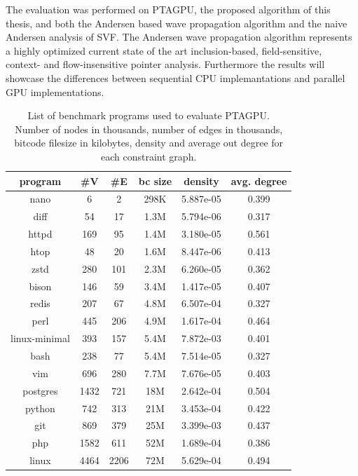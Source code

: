 The evaluation was performed on PTAGPU, the proposed algorithm of this thesis, and both the Andersen based wave propagation algorithm and the naive Andersen analysis of SVF.
The Andersen wave propagation algorithm represents a highly optimized current state of the art inclusion-based, field-sensitive, context- and flow-insensitive pointer analysis.
Furthermore the results will showcase the differences between sequential CPU implemantations and parallel GPU implementations.

\begin{table}
    \centering
    \begin{tabular}{||c c c c S[table-format = 1.3,retain-zero-exponent=true] c||}
        \hline
        program       & \#V  & \#E  & bc size & {density} & avg. degree \\
        \hline\hline
        nano          & 6    & 2    & 298K    & 5.887e-05 & 0.399       \\ 
        diff          & 54   & 17   & 1.3M    & 5.794e-06 & 0.317       \\
        httpd         & 169  & 95   & 1.4M    & 3.180e-05 & 0.561       \\
        htop          & 48   & 20   & 1.6M    & 8.447e-06 & 0.413       \\
        zstd          & 280  & 101  & 2.3M    & 6.260e-05 & 0.362       \\
        bison         & 146  & 59   & 3.4M    & 1.417e-05 & 0.407       \\
        redis         & 207  & 67   & 4.8M    & 6.507e-04 & 0.327       \\
        perl          & 445  & 206  & 4.9M    & 1.617e-04 & 0.464       \\
        linux-minimal & 393  & 157  & 5.4M    & 7.872e-03 & 0.401       \\
        bash          & 238  & 77   & 5.4M    & 7.514e-05 & 0.327       \\
        vim           & 696  & 280  & 7.7M    & 7.676e-05 & 0.403       \\
        postgres      & 1432 & 721  & 18M     & 2.642e-04 & 0.504       \\
        python        & 742  & 313  & 21M     & 3.453e-04 & 0.422       \\
        git           & 869  & 379  & 25M     & 3.399e-03 & 0.437       \\
        php           & 1582 & 611  & 52M     & 1.689e-04 & 0.386       \\
        linux         & 4464 & 2206 & 72M     & 5.629e-04 & 0.494       \\
        \hline
    \end{tabular}
    \caption{List of benchmark programs used to evaluate PTAGPU.\\Number of nodes in thousands, number of edges in thousands, bitcode filesize in kilobytes, density and average out degree for each constraint graph.}
    \label{tab:benchmarkprograms}
\end{table}


